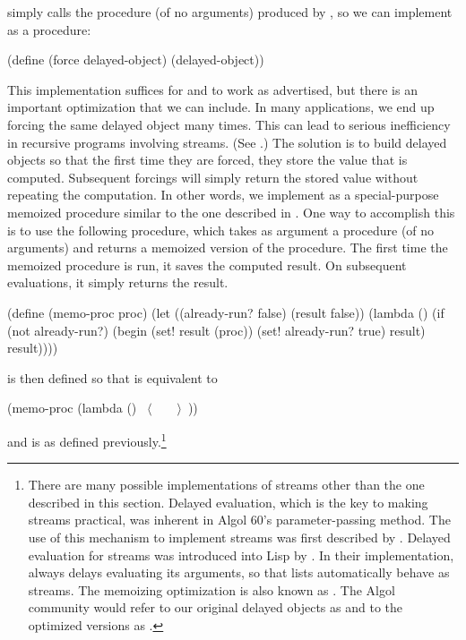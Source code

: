 \noindent
{} simply calls the procedure (of no arguments) produced by
, so we can implement  as a procedure:

\begin{codeBlock}
(define (force delayed-object) (delayed-object))
\end{codeBlock}

\noindent
This implementation suffices for  and  to work as
advertised, but there is an important optimization that we can include.  In
many applications, we end up forcing the same delayed object many times.  This
can lead to serious inefficiency in recursive programs involving streams.  (See
.)  The solution is to build delayed objects so that the
first time they are forced, they store the value that is computed.  Subsequent
forcings will simply return the stored value without repeating the computation.
In other words, we implement  as a special-purpose memoized
procedure similar to the one described in .  One way to
accomplish this is to use the following procedure, which takes as argument a
procedure (of no arguments) and returns a memoized version of the procedure.
The first time the memoized procedure is run, it saves the computed result.  On
subsequent evaluations, it simply returns the result.

\begin{codeBlock}
(define (memo-proc proc)
  (let ((already-run? false) (result false))
    (lambda ()
      (if (not already-run?)
          (begin (set! result (proc))
                 (set! already-run? true)
                 result)
          result))))
\end{codeBlock}

\noindent
{} is then defined so that  is equivalent
to

\begin{codeBlock}
(memo-proc (lambda () ~\(\langle \)~~~~\(\rangle \)~))
\end{codeBlock}

\noindent
and  is as defined previously.\footnote{There are many possible
implementations of streams other than the one described in this section.
Delayed evaluation, which is the key to making streams practical, was inherent
in Algol 60's  parameter-passing method.  The use of this
mechanism to implement streams was first described by .  Delayed
evaluation for streams was introduced into Lisp by . In
their implementation,  always delays evaluating its arguments, so
that lists automatically behave as streams.  The memoizing optimization is also
known as .  The Algol community would refer to our
original delayed objects as  and to the optimized
versions as .}

